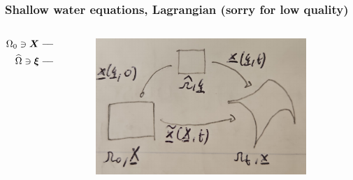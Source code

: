\documentclass[pt12]{beamer}
\newcommand{\uvec}[2][3]{\boldsymbol{#2\mkern-#1mu}\mkern#1mu}
\begin{document}
\begin{frame}
\frametitle{Shallow water equations, Lagrangian (sorry for low quality)}

    \begin{columns}
        \begin{column}{0.50\textwidth}
\begin{align*}
\Omega_0  \ni \uvec{X} \longrightarrow & ~ \uvec{x}=\widetilde{\uvec{x}}(\uvec{X},t) \in \Omega_t\\
\widehat{\Omega}  \ni \uvec{\xi} \longrightarrow & ~\uvec{x}=\uvec{x}(\uvec{\xi},t) \in \Omega_t\\
& \uvec{X}=\uvec{x}(\uvec{\xi},0)
\end{align*}
        \end{column}
        \begin{column}{0.50\textwidth}

\begin{figure}
         \centering
         \includegraphics[width=0.9\textwidth]{figures/lagrangian_maps.pdf}
\end{figure}
        \end{column}
    \end{columns}
\end{frame}
\end{document}
